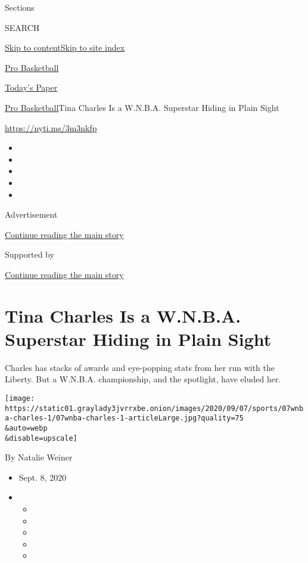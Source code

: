 Sections

SEARCH

\protect\hyperlink{site-content}{Skip to
content}\protect\hyperlink{site-index}{Skip to site index}

\href{https://www.nytimes3xbfgragh.onion/section/sports/basketball}{Pro
Basketball}

\href{https://myaccount.nytimes3xbfgragh.onion/auth/login?response_type=cookie\&client_id=vi}{}

\href{https://www.nytimes3xbfgragh.onion/section/todayspaper}{Today's
Paper}

\href{/section/sports/basketball}{Pro Basketball}\textbar{}Tina Charles
Is a W.N.B.A. Superstar Hiding in Plain Sight

\url{https://nyti.ms/3m3nkfp}

\begin{itemize}
\item
\item
\item
\item
\item
\end{itemize}

Advertisement

\protect\hyperlink{after-top}{Continue reading the main story}

Supported by

\protect\hyperlink{after-sponsor}{Continue reading the main story}

\hypertarget{tina-charles-is-a-wnba-superstar-hiding-in-plain-sight}{%
\section{Tina Charles Is a W.N.B.A. Superstar Hiding in Plain
Sight}\label{tina-charles-is-a-wnba-superstar-hiding-in-plain-sight}}

Charles has stacks of awards and eye-popping stats from her run with the
Liberty. But a W.N.B.A. championship, and the spotlight, have eluded
her.

\texttt{[image: https://static01.graylady3jvrrxbe.onion/images/2020/09/07/sports/07wnba-charles-1/07wnba-charles-1-articleLarge.jpg?quality=75\\\&auto=webp\\\&disable=upscale]}

By Natalie Weiner

\begin{itemize}
\item
  Sept. 8, 2020
\item
  \begin{itemize}
  \item
  \item
  \item
  \item
  \item
  \end{itemize}
\end{itemize}

